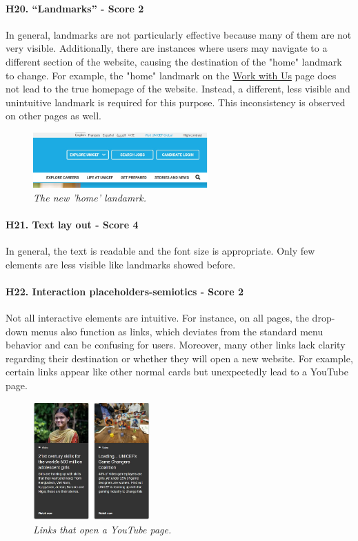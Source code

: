 \paragraph{H20. “Landmarks” - Score 2}	
In general, landmarks are not particularly effective because many of them are not very visible. Additionally, there are instances where users may navigate to a different section of the website, causing the destination of the "home" landmark to change.
For example, the "home" landmark on the \href{https://www.unicef.org/careers/}{Work with Us} page does not lead to the true homepage of the website. Instead, a different, less visible and unintuitive landmark is required for this purpose. This inconsistency is observed on other pages as well.
\begin{figure}[!h]
	\begin{center}
		\includegraphics[width=0.6\textwidth]{Picture13.jpg}
		\captionsetup{font=small}
		\caption{\textit{The new 'home' landamrk.}}
	\end{center}
\end{figure}
\newline
\paragraph{H21. Text lay out - Score 4}	In general, the text is readable and the font size is appropriate. Only few elements are less visible like landmarks showed before.
\newline
\paragraph{H22. Interaction placeholders-semiotics - Score 2}	Not all interactive elements are intuitive. For instance, on all pages, the drop-down menus also function as links, which deviates from the standard menu behavior and can be confusing for users. Moreover, many other links lack clarity regarding their destination or whether they will open a new website.
For example, certain links appear like other normal cards but unexpectedly lead to a YouTube page.
\begin{figure}[!h]
	\begin{center}
		\includegraphics[width=0.4\textwidth]{Picture14.jpg}
		\captionsetup{font=small}
		\caption{\textit{Links that open a YouTube page.}}
	\end{center}
\end{figure}
\newline
